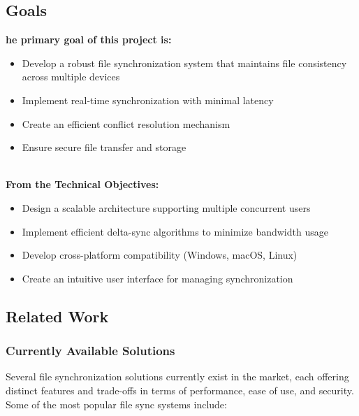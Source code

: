 \documentclass{article}
\begin{document}
    \subsection{Goals}
      \textbf{he primary goal of this project is:}
      \begin{itemize}
        \item Develop a robust file synchronization system that maintains file consistency across multiple devices
        \item Implement real-time synchronization with minimal latency
		    \item Create an efficient conflict resolution mechanism
        \item Ensure secure file transfer and storage
      \end{itemize} \\ \textbf{From the Technical Objectives:}
      \begin{itemize}
        \item Design a scalable architecture supporting multiple concurrent users
        \item Implement efficient delta-sync algorithms to minimize bandwidth usage
        \item Develop cross-platform compatibility (Windows, macOS, Linux)
        \item Create an intuitive user interface for managing synchronization
      \end{itemize}
    \subsection{Related Work}
			\subsubsection{Currently Available Solutions}
        Several file synchronization solutions currently exist in the market, each offering distinct features and trade-offs in terms of performance, ease of use, and security. Some of the most popular file sync systems include:
\end{document}
